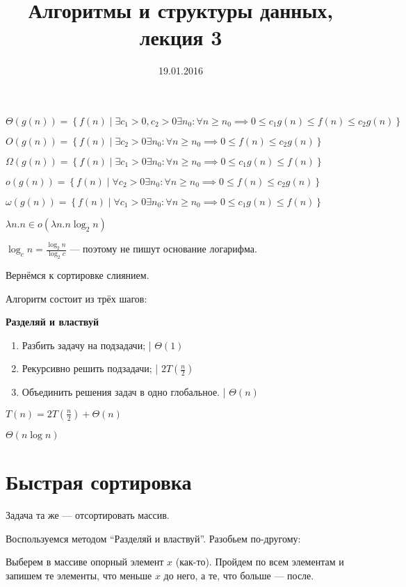 ﻿\documentclass[12pt,a4paper]{article}
\title{Алгоритмы и структуры данных, лекция 3}
\date{19.01.2016}
\author{}
\begin{document}
\maketitle

$\Theta(g(n)) = \left\{ f(n)\mid \exists c_1>0, c_2>0 \exists n_0: \forall n \geqslant n_0 \implies 0\leqslant c_1g(n)\leqslant f(n) \leqslant c_2g(n) \right\}$

$O(g(n)) = \left\{ f(n)\mid \exists  c_2>0 \exists n_0: \forall n \geqslant n_0 \implies 0\leqslant f(n) \leqslant c_2g(n) \right\}$

$\Omega(g(n)) = \left\{ f(n)\mid \exists c_1>0 \exists n_0: \forall n \geqslant n_0 \implies 0\leqslant c_1g(n)\leqslant f(n) \right\}$

$o(g(n)) = \left\{ f(n)\mid \forall  c_2>0 \exists n_0: \forall n \geqslant n_0 \implies 0\leqslant f(n) \leqslant c_2g(n) \right\}$

$\omega(g(n)) = \left\{ f(n)\mid \forall c_1>0 \exists n_0: \forall n \geqslant n_0 \implies 0\leqslant c_1g(n)\leqslant f(n) \right\}$

$\lambda n.n \in o(\lambda n.n \log_2 n)$

$\log_c n = \frac {\log_2 n}{\log_2 c}$ --- поэтому не пишут основание логарифма.

Вернёмся к сортировке слиянием. 

Алгоритм состоит из трёх шагов:

\vspace{0.5cm}
\textbf{Разделяй и властвуй}
\begin{enumerate}
    \item Разбить задачу на подзадачи; | $\Theta(1)$
    \item Рекурсивно решить подзадачи; | $2T(\frac n2)$
    \item Объединить решения задач в одно глобальное. | $\Theta(n)$
\end{enumerate}

$T(n) = 2T(\frac n2) + \Theta(n)$

$\Theta(n\log n)$

\section*{Быстрая сортировка}

Задача та же --- отсортировать массив.

Воспользуемся методом ``Разделяй и властвуй''. Разобьем по-другому:

Выберем в массиве опорный элемент $x$ (как-то). Пройдем по всем элементам и запишем те элементы, что меньше $x$ до него, а те, что больше --- после.
\end{document}
